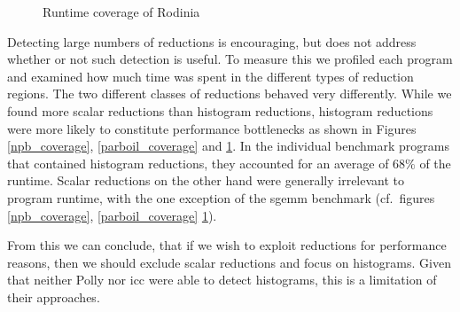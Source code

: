 \begin{figure}[ht]
    \centering
    \caption{Runtime coverage of Rodinia}
    \label{rodinia_coverage}
\end{figure}


Detecting large numbers of reductions is encouraging, but does not
address whether or not such detection is useful. To measure this we
profiled each program  and examined how much time was spent in the
different types of reduction regions.  The two different classes of
reductions behaved very differently.  While we found  more scalar
reductions than histogram reductions, histogram reductions were 
more likely to constitute performance bottlenecks as shown in Figures \ref{npb_coverage}, \ref{parboil_coverage} and  \ref{rodinia_coverage}.
In the individual benchmark programs that contained histogram reductions, they accounted for an average of $68\%$ of the
runtime.
Scalar reductions on the other hand were generally irrelevant to program runtime, with the one exception of the sgemm
benchmark (cf.\ figures \ref{npb_coverage},  \ref{parboil_coverage}    \ref{rodinia_coverage}).

From this we can conclude, that if we wish to exploit reductions for
performance reasons, then we should exclude scalar reductions and
focus on histograms.  Given that neither Polly nor icc were able to
detect histograms, this is a limitation of their approaches.


